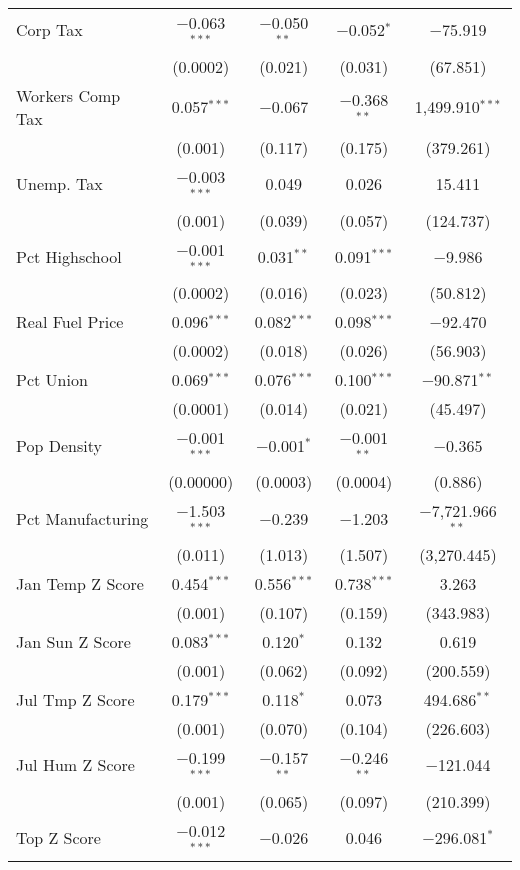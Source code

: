 \begin{table}[!htbp]
\begin{tabular}{@{\extracolsep{5pt}}lcccc}
  Corp Tax & $-$0.063$^{***}$ & $-$0.050$^{**}$ & $-$0.052$^{*}$ & $-$75.919 \\ 
  & (0.0002) & (0.021) & (0.031) & (67.851) \\ 
  Workers Comp Tax & 0.057$^{***}$ & $-$0.067 & $-$0.368$^{**}$ & 1,499.910$^{***}$ \\ 
  & (0.001) & (0.117) & (0.175) & (379.261) \\ 
  Unemp. Tax & $-$0.003$^{***}$ & 0.049 & 0.026 & 15.411 \\ 
  & (0.001) & (0.039) & (0.057) & (124.737) \\ 
  Pct Highschool & $-$0.001$^{***}$ & 0.031$^{**}$ & 0.091$^{***}$ & $-$9.986 \\ 
  & (0.0002) & (0.016) & (0.023) & (50.812) \\ 
  Real Fuel Price & 0.096$^{***}$ & 0.082$^{***}$ & 0.098$^{***}$ & $-$92.470 \\ 
  & (0.0002) & (0.018) & (0.026) & (56.903) \\ 
  Pct Union & 0.069$^{***}$ & 0.076$^{***}$ & 0.100$^{***}$ & $-$90.871$^{**}$ \\ 
  & (0.0001) & (0.014) & (0.021) & (45.497) \\ 
  Pop Density & $-$0.001$^{***}$ & $-$0.001$^{*}$ & $-$0.001$^{**}$ & $-$0.365 \\ 
  & (0.00000) & (0.0003) & (0.0004) & (0.886) \\ 
  Pct Manufacturing & $-$1.503$^{***}$ & $-$0.239 & $-$1.203 & $-$7,721.966$^{**}$ \\ 
  & (0.011) & (1.013) & (1.507) & (3,270.445) \\ 
  Jan Temp Z Score & 0.454$^{***}$ & 0.556$^{***}$ & 0.738$^{***}$ & 3.263 \\ 
  & (0.001) & (0.107) & (0.159) & (343.983) \\ 
  Jan Sun Z Score & 0.083$^{***}$ & 0.120$^{*}$ & 0.132 & 0.619 \\ 
  & (0.001) & (0.062) & (0.092) & (200.559) \\ 
  Jul Tmp Z Score & 0.179$^{***}$ & 0.118$^{*}$ & 0.073 & 494.686$^{**}$ \\ 
  & (0.001) & (0.070) & (0.104) & (226.603) \\ 
  Jul Hum Z Score & $-$0.199$^{***}$ & $-$0.157$^{**}$ & $-$0.246$^{**}$ & $-$121.044 \\ 
  & (0.001) & (0.065) & (0.097) & (210.399) \\ 
  Top Z Score & $-$0.012$^{***}$ & $-$0.026 & 0.046 & $-$296.081$^{*}$ \\ 

\end{tabular}
\end{table}
